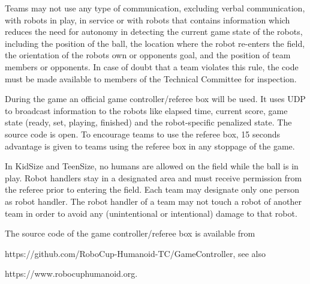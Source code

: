 Teams may not use any type of communication, excluding verbal communication, with robots in play, in service or with robots   that contains information which reduces the need for autonomy in detecting the current game state of the robots, including the position of the ball, the location where the robot re-enters the field, the orientation of the robots own or opponents goal, and the position of team members or opponents. In case of doubt that a team violates this rule, the code must be made available to members of the Technical Committee for inspection.

\bigskip

During the game an official game controller/referee box will be used. It uses UDP to broadcast information to the robots like elapsed time, current score, game state (ready, set, playing, finished) and the robot-specific penalized state. The source code is open. To encourage teams to use the referee box, 15 seconds advantage is given to teams using the referee box in any stoppage of the game.



\bigskip

In KidSize and TeenSize, no humans are allowed on the field while the ball is in play. Robot handlers stay in a designated area and must receive permission from the referee prior to entering the field. Each team may designate only one person as robot handler. The robot handler of a team may not touch a robot of another team in order to avoid any (unintentional or intentional) damage to that robot. 

\bigskip

The source code of the game controller/referee box is available from

\textcolor[rgb]{0.0,0.0,0.49803922}{https://github.com/RoboCup-Humanoid-TC/GameController},
see also 

\textcolor[rgb]{0.0,0.0,0.49803922}{https://www.robocuphumanoid.org}.


